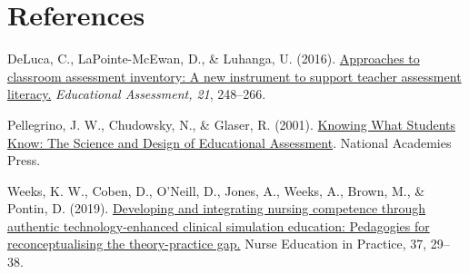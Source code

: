 \documentclass[
]{book}
\begin{document}
\hypertarget{references-1}{%
\section*{References}\label{references-1}}

DeLuca, C., LaPointe-McEwan, D., \& Luhanga, U. (2016). \href{https://doi.org/10/gfgtsg}{Approaches to classroom assessment inventory: A new instrument to support teacher assessment literacy.} \emph{Educational Assessment, 21}, 248--266.

Pellegrino, J. W., Chudowsky, N., \& Glaser, R. (2001). \href{https://doi.org/10.17226/10019}{Knowing What Students Know: The Science and Design of Educational Assessment}. National Academies Press.

Weeks, K. W., Coben, D., O'Neill, D., Jones, A., Weeks, A., Brown, M., \& Pontin, D. (2019). \href{https://doi.org/10.1016/j.nepr.2019.04.010}{Developing and integrating nursing competence through authentic technology-enhanced clinical simulation education: Pedagogies for reconceptualising the theory-practice gap.} Nurse Education in Practice, 37, 29--38.

  
\end{document}
